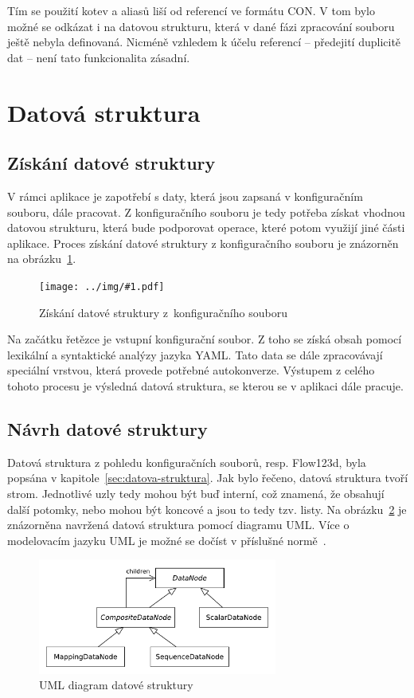 \documentclass[FM,bw,DP]{tulthesis}
\newcommand{\includeimg}[2]{%
\begin{figure}[h]
	\centering
    \texttt{[image: ../img/\#1.pdf]}
    \caption{#2}
	\label{img:#1}
\end{figure}
}
\begin{document}
Tím se použití kotev a aliasů liší od referencí ve formátu CON. V tom bylo možné se odkázat i na datovou strukturu, která v dané fázi zpracování souboru ještě nebyla definovaná. Nicméně vzhledem k účelu referencí -- předejití duplicitě dat -- není tato funkcionalita zásadní. 



\section{Datová struktura}

\subsection{Získání datové struktury}

V rámci aplikace je zapotřebí s daty, která jsou zapsaná v konfiguračním souboru, dále pracovat. Z konfiguračního souboru je tedy potřeba získat vhodnou datovou strukturu, která bude podporovat operace, které potom využijí jiné části aplikace. Proces získání datové struktury z konfiguračního souboru je znázorněn na obrázku~\ref{img:data_structure_chain}.

\includeimg{data_structure_chain}{Získání datové struktury z~konfiguračního souboru}

Na začátku řetězce je vstupní konfigurační soubor. Z toho se získá obsah pomocí lexikální a syntaktické analýzy jazyka \gls{YAML}. Tato data se dále zpracovávají speciální vrstvou, která provede potřebné autokonverze. Výstupem z celého tohoto procesu je výsledná datová struktura, se kterou se v aplikaci dále pracuje.

\subsection{Návrh datové struktury}

Datová struktura z pohledu konfiguračních souborů, resp. Flow123d, byla popsána v kapitole~\ref{sec:datova-struktura}. Jak bylo řečeno, datová struktura tvoří strom. Jednotlivé uzly tedy mohou být buď interní, což znamená, že obsahují další potomky, nebo mohou být koncové a jsou to tedy tzv. listy. Na obrázku~\ref{img:data_node} je znázorněna navržená datová struktura pomocí diagramu \gls{UML}. Více o modelovacím jazyku \gls{UML} je možné se dočíst v příslušné normě~\cite{bib:uml}.

\begin{figure}[h]
	\centering
    \includegraphics[width=0.7\textwidth]{../img/data_node.pdf}
    \caption{UML diagram datové struktury}
	\label{img:data_node}
\end{figure}
\end{document}
